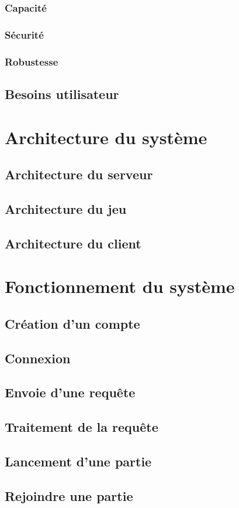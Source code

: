 \documentclass{article}
\begin{document}
\subsubsection{Capacité}

\subsubsection{Sécurité}

\subsubsection{Robustesse}

\subsection{Besoins utilisateur}

\section{Architecture du système}

\subsection{Architecture du serveur}

\subsection{Architecture du jeu}

\subsection{Architecture du client}

\section{Fonctionnement du système}

\subsection{Création d'un compte}

\subsection{Connexion}

\subsection{Envoie d'une requête}

\subsection{Traitement de la requête}

\subsection{Lancement d'une partie}

\subsection{Rejoindre une partie} 
\end{document}
